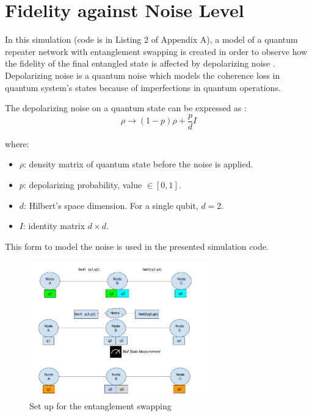 \documentclass[12pt,a4paper] {report}
\begin{document}
		\section{Fidelity against Noise Level}	
		
		In this simulation (code is in Listing 2 of Appendix A), a model of a quantum repeater network with
		entanglement swapping is created in order to observe how the fidelity of the final entangled state is
		affected by depolarizing noise \cite{depolarization}. Depolarizing noise is a quantum noise which models the
		coherence loss in quantum system's states because of imperfections in quantum operations.
		
		The depolarizing noise on a quantum state can be expressed as \cite{depolar2}:
			\[
			\rho \to (1-p)\rho + \frac{p}{d}I
			\]

		where:

		\begin{itemize}
			    \item \( \rho \): density matrix of quantum state before the noise is applied.
			    \item \( p \): depolarizing probability,  value \(\in [0, 1]\).
			    \item \( d \): Hilbert's space dimension. For a single qubit, \( d = 2 \).
			    \item \( I \): identity matrix \( d \times d \).
		\end{itemize}

		This form to model the noise is used in the presented simulation code.
	
		\begin{figure}[h!]
			\centering
			\includegraphics[width=0.7\textwidth]{repeater/entanglement_swap.png}
			\caption{Set up for the entanglement swapping}
			\label{fig:}
		\end{figure}		
\end{document}
